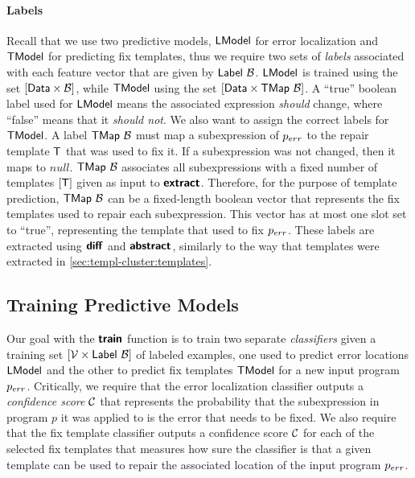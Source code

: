 \paragraph{Labels}
Recall that we use two predictive models, $\mathsf{LModel}$ for error localization and
$\mathsf{TModel}$ for predicting fix templates, thus we require two sets of
\emph{labels} associated with each feature vector that are given by
$\mathsf{Label}\ \mathcal{B}$. $\mathsf{LModel}$ is trained using the set $[\mathsf{Data} \times
\mathcal{B}]$, while $\mathsf{TModel}$ using the set $[\mathsf{Data} \times
\mathsf{TMap}\ \mathcal{B}]$. A ``true'' boolean label used for $\mathsf{LModel}$ means the
associated expression \emph{should} change, where ``false'' means that it
\emph{should not}. We also want to assign the correct labels for $\mathsf{TModel}$. A
label $\mathsf{TMap}\ \mathcal{B}$ must map a subexpression of $p_{err}$ to the repair
template $\mathsf{T}$ that was used to fix it. If a subexpression was not changed, then
it maps to $null$. $\mathsf{TMap}\ \mathcal{B}$ associates all subexpressions with a fixed
number of templates $[\mathsf{T}]$ given as input to $\bm{\mathsf{extract}}$. Therefore, for
the purpose of template prediction, $\mathsf{TMap}\ \mathcal{B}$ can be a fixed-length
boolean vector that represents the fix templates used to repair each
subexpression. This vector has at most one slot set to ``true'', representing
the template that used to fix $p_{err}$. These labels are extracted using
$\bm{\mathsf{diff}}$ and $\bm{\mathsf{abstract}}$, similarly to the way that templates were extracted
in \autoref{sec:templ-cluster:templates}.

\subsection{Training Predictive Models}
\label{subsec:train}
\lstDeleteShortInline{|} %

Our goal with the $\bm{\mathsf{train}}$ function is to train two separate
\emph{classifiers} given a training set $[\mathcal{V} \times \mathsf{Label}\ \mathcal{B}]$
of labeled examples, one used to predict error locations $\mathsf{LModel}$ and the other
to predict fix templates $\mathsf{TModel}$ for a new input program $p_{err}$. Critically,
we require that the error localization classifier outputs a \emph{confidence
score} $\mathcal{C}$ that represents the probability that the subexpression in program
$p$ it was applied to is the error that needs to be fixed. We also require that
the fix template classifier outputs a confidence score $\mathcal{C}$ for each of the
selected fix templates that measures how sure the classifier is that a given
template can be used to repair the associated location of the input program
$p_{err}$.

